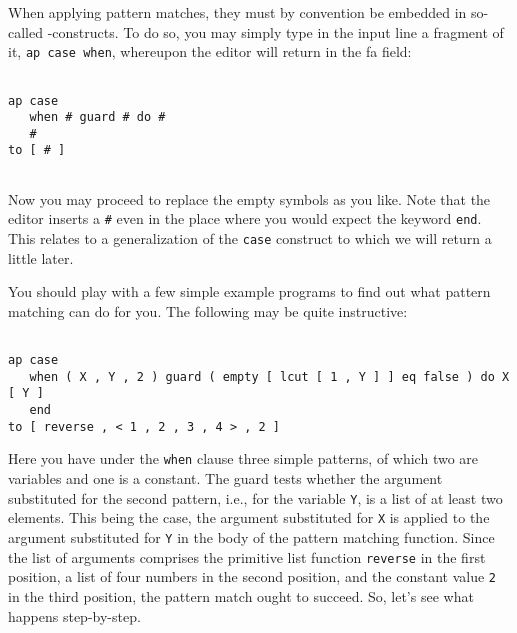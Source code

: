 When applying pattern matches, they must by convention be embedded in
so-called {-constructs}. To do so, you may simply type in the input line a fragment of it, 
{\tt ap case when}, whereupon the editor will return in the {\sc fa} field:
\begin{verbatim}

ap case 
   when # guard # do #
   #
to [ # ]


\end{verbatim}
Now you may proceed to replace the empty symbols as you like. Note that the editor
inserts a {\tt \#} even in the place where you would expect the keyword {\tt end}.
This relates to a generalization of the {\tt case} construct to which we will return
a little later.

You should play with a few simple example programs to find out what pattern matching can do for
you. The following may be quite instructive:
\begin{verbatim}

ap case 
   when ( X , Y , 2 ) guard ( empty [ lcut [ 1 , Y ] ] eq false ) do X [ Y ]
   end
to [ reverse , < 1 , 2 , 3 , 4 > , 2 ]

\end{verbatim}
Here you have under the {\tt when} clause three simple patterns, of which two are 
variables and one is a constant. The guard tests whether the argument substituted for the
second pattern, i.e., for the variable {\tt Y}, is a list of at least two elements. This being the case, the argument substituted
for {\tt X} is applied to the argument substituted for {\tt Y} in the body of the pattern
matching function. Since the list of arguments comprises the 
primitive list function {\tt reverse} in the first position, a list of four numbers in the second
 position, and the constant value {\tt 2} in the third position, the pattern match ought to succeed.
So, let's see what happens step-by-step.

